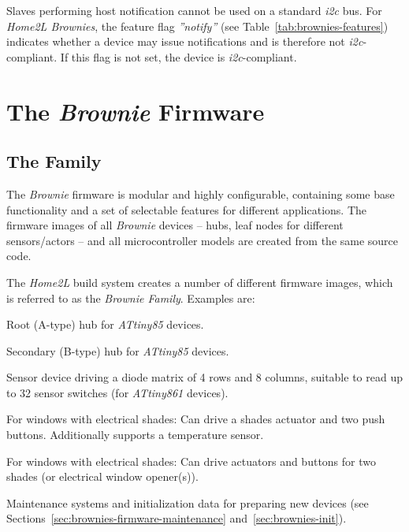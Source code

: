 \documentclass[12pt,english,parskip=half,headheight=19pt]{scrreprt}
\renewenvironment{description}[1][8ex]
  {\list{}{\labelwidth=5ex \leftmargin=#1 \let\makelabel\descriptionlabel}}
  {\endlist}
\begin{document}
Slaves performing host notification cannot be used on a standard \textit{i2c} bus. For \textit{Home2L Brownies}, the feature flag \textit{''notify''} (see Table~\ref{tab:brownies-features}) indicates whether a device may issue notifications and is therefore not \textit{i2c}-compliant. If this flag is not set, the device is \textit{i2c}-compliant.





\clearpage
\section{The \textit{Brownie} Firmware}
\label{sec:brownies-firmware}



\subsection{The Family}
\label{sec:brownies-firmware-family}

The \textit{Brownie} firmware is modular and highly configurable, containing some base functionality and a set of selectable features for different applications. The firmware images of all \textit{Brownie} devices -- hubs, leaf nodes for different sensors/actors -- and all microcontroller models are created from the same source code.

The \textit{Home2L} build system creates a number of different firmware images, which is referred to as the \textit{Brownie Family}. Examples are:

\begin{description}
  \item[ahub.t85:] Root (A-type) hub for \textit{ATtiny85} devices.
  \item[bhub.t85:] Secondary (B-type) hub for \textit{ATtiny85} devices.
  \item[mat4x8.t861:] Sensor device driving a diode matrix of 4 rows and 8 columns, suitable to read up to 32 sensor switches (for \textit{ATtiny861} devices).
  \item[win.t84:] For windows with electrical shades: Can drive a shades actuator and two push buttons. Additionally supports a temperature sensor.
  \item[win2.t84:] For windows with electrical shades: Can drive actuators and buttons for two shades (or electrical window opener(s)).
  \item[init.t84, init.t85, init.t861:] Maintenance systems and initialization data for preparing new devices (see Sections~\ref{sec:brownies-firmware-maintenance} and~\ref{sec:brownies-init}).
\end{description}
\end{document}
